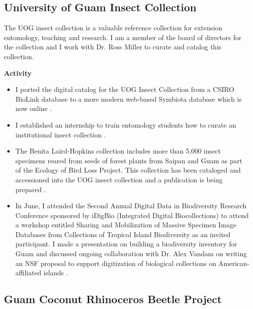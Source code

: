 \documentclass[12pt,english]{scrartcl}
\begin{document}
\subsection{University of Guam Insect Collection}
\begin{refsection}

The UOG insect collection is a valuable reference collection for extension
entomology, teaching and research. I am a member of the board of directors
for the collection and I work with Dr. Ross Miller to curate and catalog
this collection.

\raggedright\vspace{2mm}\textbf{Activity}

\begin{itemize}

\item I ported the digital catalog for the UOG Insect Collection from a
CSIRO BioLink database to a more modern web-based Symbiota database
which is now online \cite{moore2018scanuniversity}.

\item I established an internship to train entomology students how to curate
an institutional insect collection \cite{moore2018internship}.

\item The Benita Laird-Hopkins collection includes more than 5,000 insect
specimens reared from seeds of forest plants from Saipan and Guam
as part of the Ecology of Bird Loss Project. This collection has been
cataloged and accessioned into the UOG insect collection and a publication
is being prepared \cite{laird-hopkins2018inpreparation,moore2018onlinecatalog}.
\item In June, I attended the Second Annual Digital Data in Biodiversity
Research Conference sponsored by iDigBio (Integrated Digital Biocollections)
to attend a workshop entitled Sharing and Mobilization of Massive
Specimen Image Databases from Collections of Tropical Island Biodiversity
as an invited participant. I made a presentation on building a biodiversity
inventory for Guam \cite{moore2018building2} and discussed ongoing
collaboration with Dr. Alex Vandam on writing an NSF proposal to support
digitization of biological collections on American-affiliated islands
\cite{moore2018tripreport}.
\end{itemize}

\printbibliography
\end{refsection}

\subsection{Guam Coconut Rhinoceros Beetle Project}
\end{document}
